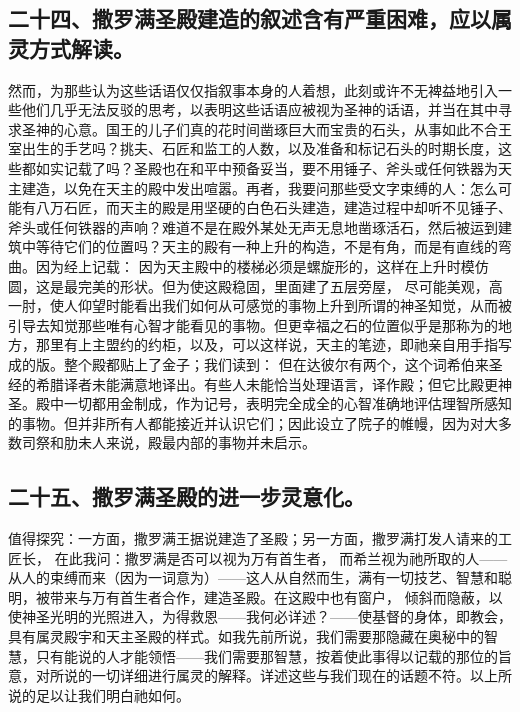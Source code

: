 
\subsection{二十四、撒罗满圣殿建造的叙述含有严重困难，应以属灵方式解读。}

然而，为那些认为这些话语仅仅指叙事本身的人着想，此刻或许不无裨益地引入一些他们几乎无法反驳的思考，以表明这些话语应被视为圣神的话语，并当在其中寻求圣神的心意。国王的儿子们真的花时间凿琢巨大而宝贵的石头，从事如此不合王室出生的手艺吗？挑夫、石匠和监工的人数，以及准备和标记石头的时期长度，这些都如实记载了吗？圣殿也在和平中预备妥当，要不用锤子、斧头或任何铁器为天主建造，以免在天主的殿中发出喧嚣。再者，我要问那些受文字束缚的人：怎么可能有八万石匠，而天主的殿是用坚硬的白色石头建造，建造过程中却听不见锤子、斧头或任何铁器的声响？难道不是在殿外某处无声无息地凿琢活石，然后被运到建筑中等待它们的位置吗？天主的殿有一种上升的构造，不是有角，而是有直线的弯曲。因为经上记载： 因为天主殿中的楼梯必须是螺旋形的，这样在上升时模仿圆，这是最完美的形状。但为使这殿稳固，里面建了五层旁屋， 尽可能美观，高一肘，使人仰望时能看出我们如何从可感觉的事物上升到所谓的神圣知觉，从而被引导去知觉那些唯有心智才能看见的事物。但更幸福之石的位置似乎是那称为的地方，那里有上主盟约的约柜，以及，可以这样说，天主的笔迹，即祂亲自用手指写成的版。整个殿都贴上了金子；我们读到： 但在达彼尔有两个，这个词希伯来圣经的希腊译者未能满意地译出。有些人未能恰当处理语言，译作殿；但它比殿更神圣。殿中一切都用金制成，作为记号，表明完全成全的心智准确地评估理智所感知的事物。但并非所有人都能接近并认识它们；因此设立了院子的帷幔，因为对大多数司祭和肋未人来说，殿最内部的事物并未启示。\par


\subsection{二十五、撒罗满圣殿的进一步灵意化。}

值得探究：一方面，撒罗满王据说建造了圣殿；另一方面，撒罗满打发人请来的工匠长， 在此我问：撒罗满是否可以视为万有首生者， 而希兰视为祂所取的人——从人的束缚而来（因为一词意为）——这人从自然而生，满有一切技艺、智慧和聪明，被带来与万有首生者合作，建造圣殿。在这殿中也有窗户， 倾斜而隐蔽，以使神圣光明的光照进入，为得救恩——我何必详述？——使基督的身体，即教会，具有属灵殿宇和天主圣殿的样式。如我先前所说，我们需要那隐藏在奥秘中的智慧，只有能说的人才能领悟——我们需要那智慧，按着使此事得以记载的那位的旨意，对所说的一切详细进行属灵的解释。详述这些与我们现在的话题不符。以上所说的足以让我们明白祂如何。\par

